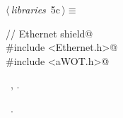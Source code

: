 \documentclass[a4paper, 12pt]{article}
\begin{document}
\begin{flushleft} \small
\begin{minipage}{\linewidth}\label{scrap6}\raggedright\small
{}$\langle\,${\itshape libraries}\nobreak\ {\footnotesize{5c}}$\,\rangle\equiv$
\vspace{-1ex}
\begin{list}{}{\setlength{\leftmargin}{1em}} \item
\mbox{}\verb@// Ethernet shield@\\
\mbox{}\verb@#include <Ethernet.h>@\\
\mbox{}\verb@#include <aWOT.h>@\\
\mbox{}{\NWsep}
\end{list}
\vspace{-1ex}
\vspace{-1ex}
\footnotesize
\begin{list}{}{\setlength{\itemsep}{-\parsep}\setlength{\itemindent}{-\leftmargin}}
\item \NWtxtMacroDefBy\ , .
\item \NWtxtMacroRefIn\ .
\end{list}
\end{minipage}
\end{flushleft}
\end{document}
